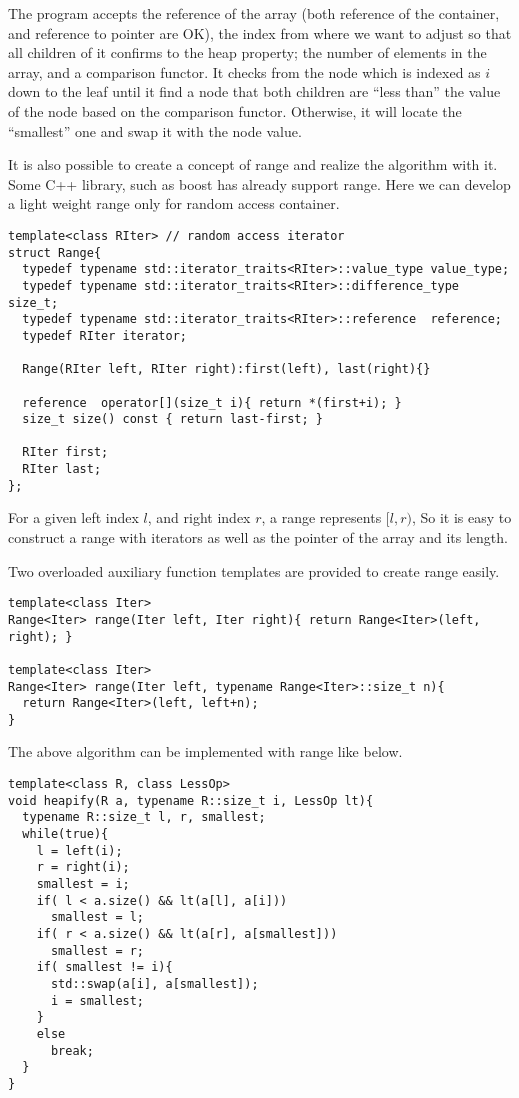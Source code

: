 \documentclass{article}
\begin{document}
The program accepts the reference of the array (both reference
of the container, and reference to pointer are OK), the index
from where we want to adjust so that all children of it confirms
to the heap property; the number of elements in the array, and
a comparison functor. It checks from the node which is indexed
as $i$ down to the leaf until it find a node that both children are
``less than'' the value of the node based on the comparison functor. 
Otherwise, it will locate the ``smallest'' one and swap it with
the node value.

It is also possible to create a concept of range and realize the 
algorithm with it. Some C++ library, such as boost has already
support range. Here we can develop a light weight range only for
random access container.

\begin{lstlisting}
template<class RIter> // random access iterator
struct Range{
  typedef typename std::iterator_traits<RIter>::value_type value_type;
  typedef typename std::iterator_traits<RIter>::difference_type size_t;
  typedef typename std::iterator_traits<RIter>::reference  reference;
  typedef RIter iterator;

  Range(RIter left, RIter right):first(left), last(right){}

  reference  operator[](size_t i){ return *(first+i); }
  size_t size() const { return last-first; }
  
  RIter first;
  RIter last;
};
\end{lstlisting}

For a given left index $l$, and right index $r$, a range represents
$[l, r)$, So it is easy to construct a range with iterators as well
as the pointer of the array and its length.

Two overloaded auxiliary function templates are provided to create
range easily.

\begin{lstlisting}
template<class Iter>
Range<Iter> range(Iter left, Iter right){ return Range<Iter>(left, right); }

template<class Iter>
Range<Iter> range(Iter left, typename Range<Iter>::size_t n){
  return Range<Iter>(left, left+n);
}
\end{lstlisting}

The above algorithm can be implemented with range like below.

\begin{lstlisting}
template<class R, class LessOp>
void heapify(R a, typename R::size_t i, LessOp lt){
  typename R::size_t l, r, smallest;
  while(true){
    l = left(i);
    r = right(i);
    smallest = i;
    if( l < a.size() && lt(a[l], a[i]))
      smallest = l;
    if( r < a.size() && lt(a[r], a[smallest]))
      smallest = r;
    if( smallest != i){
      std::swap(a[i], a[smallest]);
      i = smallest;
    }
    else
      break;
  }
}
\end{lstlisting}
\end{document}
